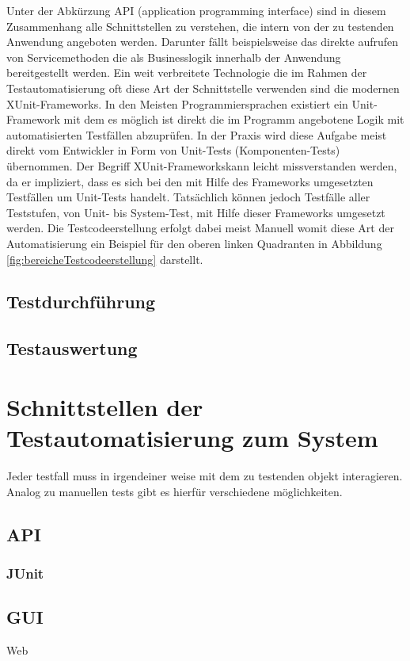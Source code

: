 Unter der Abkürzung API (application programming interface) sind in diesem Zusammenhang alle Schnittstellen zu verstehen, die intern von der zu testenden Anwendung angeboten werden. Darunter fällt beispielsweise das direkte aufrufen von Servicemethoden die als Businesslogik innerhalb der Anwendung bereitgestellt werden.
Ein weit verbreitete Technologie die im Rahmen der Testautomatisierung oft diese Art der Schnittstelle verwenden sind die modernen \grq XUnit-Frameworks\grq. In den Meisten Programmiersprachen existiert ein Unit-Framework mit dem es möglich ist direkt die im Programm angebotene Logik mit automatisierten Testfällen abzuprüfen. In der Praxis wird diese Aufgabe meist direkt vom Entwickler in Form von Unit-Tests (Komponenten-Tests) übernommen. Der Begriff \grq XUnit-Frameworks\grq kann leicht missverstanden werden, da er impliziert, dass es sich bei den mit Hilfe des Frameworks umgesetzten Testfällen um Unit-Tests handelt. Tatsächlich können jedoch Testfälle aller Teststufen, von Unit- bis System-Test, mit Hilfe dieser Frameworks umgesetzt werden.
Die Testcodeerstellung erfolgt dabei meist Manuell womit diese Art der Automatisierung ein Beispiel für den oberen linken Quadranten in Abbildung \ref{fig:bereicheTestcodeerstellung} darstellt.







\subsection{Testdurchführung}
\label{subsec:testdurchführung}


\subsection{Testauswertung}
\label{subsec:testauswertung}



\section{Schnittstellen der Testautomatisierung zum System}
\label{sec:schnittstellen_der_testautomatisierung_zum_syste}

Jeder testfall muss in irgendeiner weise mit dem zu testenden objekt interagieren.
Analog zu manuellen tests gibt es hierfür verschiedene möglichkeiten.
\subsection{API}
\subsubsection{JUnit}
\label{sec:junit}

\subsection{GUI}
Web
